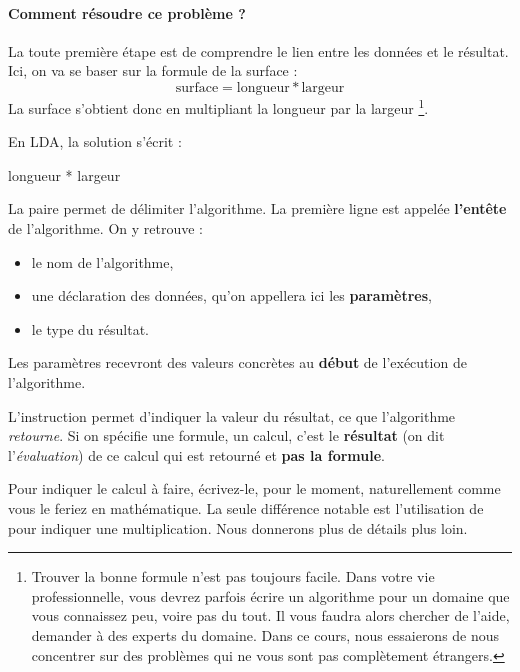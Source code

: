 			\paragraph{Comment résoudre ce problème ?} 
			La toute première étape est de comprendre 
			le lien entre les données et le résultat. 
			Ici, on va se baser sur la formule de la surface :
			\[
				\textrm{surface} = \textrm{longueur} * \textrm{largeur}
			\]
			La surface s'obtient donc en multipliant la longueur par la largeur%
			\footnote{%
				Trouver la bonne formule n'est pas toujours facile.
				Dans votre vie professionnelle, 
				vous devrez parfois écrire un algorithme
				pour un domaine que vous connaissez peu,
				voire pas du tout.
				Il vous faudra alors chercher de l'aide,
				demander à des experts du domaine.
				Dans ce cours,
				nous essaierons de nous concentrer sur des problèmes
				qui ne vous sont pas complètement étrangers.
			}.
			
			En LDA, la solution s'écrit :
			
			\begin{LDA}
					\Return longueur * largeur
				\EndAlgo
			\end{LDA}
		
			La paire \lda{\algorithmicalgo-\algorithmicend\ \algorithmicalgo}
			permet de délimiter l'algorithme.
			La première ligne est appelée 
			\textbf{l'entête} de l'algorithme.
			On y retrouve :
			\begin{itemize}
				\item 
					le nom de l'algorithme,
				\item 
					une déclaration des données, 
					qu’on appellera ici les \textbf{paramètres}, 
				\item 
					le type du résultat.
			\end{itemize}
		
			Les paramètres recevront des valeurs concrètes
			au \textbf{début} de l’exécution de l'algorithme. 
		
			L'instruction \lda{\algorithmicreturn}
			permet d'indiquer la valeur du résultat, 
			ce que l'algorithme \emph{retourne}.
			Si on spécifie une formule, un calcul,
			c'est le \textbf{résultat} (on dit l'\emph{évaluation}) 
			de ce calcul qui est retourné et \textbf{pas la formule}.
		
			Pour indiquer le calcul à faire,
			écrivez-le, pour le moment,
			naturellement comme vous le feriez en mathématique.
			La seule différence notable est l'utilisation de \lda{*}
			pour indiquer une multiplication.
			Nous donnerons plus de détails plus loin.
	
